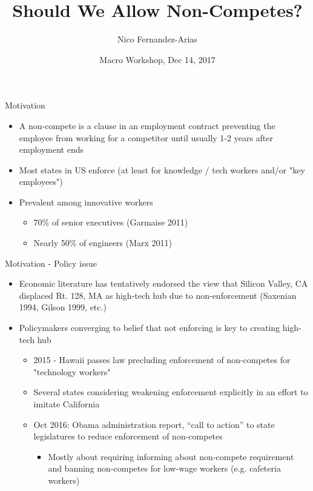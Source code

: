 \documentclass[english,usenames,dvipsnames]{beamer}
\title{Should We Allow Non-Competes?}
\author{Nico Fernandez-Arias}
\date[Dec 14 2017]{Macro Workshop, Dec 14, 2017}
\begin{document}
	
\frame{\titlepage}

\begin{frame}{Motivation}
\label{Motivation}
\begin{itemize}
	
	\item A non-compete is a clause in an employment contract preventing the employee from working for a competitor until usually 1-2 years after employment ends
	
	\item Most states in US enforce (at least for knowledge / tech workers and/or "key employees") 
	
	\item Prevalent among innovative workers
	\begin{itemize}
		\item 70\% of senior executives (Garmaise 2011)
		\item Nearly 50\% of engineers (Marx 2011)
	\end{itemize}

\end{itemize}
\end{frame}

\begin{frame}{Motivation - Policy issue}
\begin{itemize}
	\item Economic literature has tentatively endorsed the view that Silicon Valley, CA displaced Rt. 128, MA as
	high-tech hub due to non-enforcement (Saxenian 1994, Gilson 1999, etc.)
	\item Policymakers converging to belief that not enforcing is key to creating high-tech hub
	\begin{itemize}
		\item 2015 - Hawaii passes law precluding enforcement of non-competes for "technology workers"
		\item Several states considering weakening enforcement explicitly in an effort to imitate California \hyperlink{mapofenforcement}{} 
		\item Oct 2016: Obama administration report, ``call to action'' to state legislatures
		to reduce enforcement of non-competes
		\begin{itemize}
			\item Mostly about requiring informing about non-compete requirement and banning non-competes for low-wage workers (e.g. cafeteria workers) 
		\end{itemize}
	\end{itemize}
\end{itemize}
\end{frame}
\end{document}
